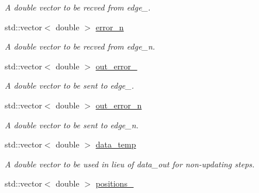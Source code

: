 \begin{DoxyCompactItemize}
\begin{DoxyCompactList}\small\item\em A double vector to be recved from edge\-\_. \end{DoxyCompactList}\item 
\hypertarget{classone__d_1_1solver_ae8898a6ede0f1daad9754364a267b7ae}{std\-::vector$<$ double $>$ \hyperlink{classone__d_1_1solver_ae8898a6ede0f1daad9754364a267b7ae}{error\-\_\-n}}\label{classone__d_1_1solver_ae8898a6ede0f1daad9754364a267b7ae}

\begin{DoxyCompactList}\small\item\em A double vector to be recved from edge\-\_\-n. \end{DoxyCompactList}\item 
\hypertarget{classone__d_1_1solver_abb22af2fc401d3ed93ae3f400028c9de}{std\-::vector$<$ double $>$ \hyperlink{classone__d_1_1solver_abb22af2fc401d3ed93ae3f400028c9de}{out\-\_\-error\-\_}}\label{classone__d_1_1solver_abb22af2fc401d3ed93ae3f400028c9de}

\begin{DoxyCompactList}\small\item\em A double vector to be sent to edge\-\_. \end{DoxyCompactList}\item 
\hypertarget{classone__d_1_1solver_ab1ed5c7ce3f6ec0bdc9a6eb8cefaf507}{std\-::vector$<$ double $>$ \hyperlink{classone__d_1_1solver_ab1ed5c7ce3f6ec0bdc9a6eb8cefaf507}{out\-\_\-error\-\_\-n}}\label{classone__d_1_1solver_ab1ed5c7ce3f6ec0bdc9a6eb8cefaf507}

\begin{DoxyCompactList}\small\item\em A double vector to be sent to edge\-\_\-n. \end{DoxyCompactList}\item 
\hypertarget{classone__d_1_1solver_aac1795dc7503b6c96b5c6ad59fc9de20}{std\-::vector$<$ double $>$ \hyperlink{classone__d_1_1solver_aac1795dc7503b6c96b5c6ad59fc9de20}{data\-\_\-temp}}\label{classone__d_1_1solver_aac1795dc7503b6c96b5c6ad59fc9de20}

\begin{DoxyCompactList}\small\item\em A double vector to be used in lieu of data\-\_\-out for non-\/updating steps. \end{DoxyCompactList}\item 
\hypertarget{classone__d_1_1solver_ad34bc1962465a7030a22c825d9fa7473}{std\-::vector$<$ double $>$ \hyperlink{classone__d_1_1solver_ad34bc1962465a7030a22c825d9fa7473}{positions\-\_}}\label{classone__d_1_1solver_ad34bc1962465a7030a22c825d9fa7473}


\end{DoxyCompactItemize}
